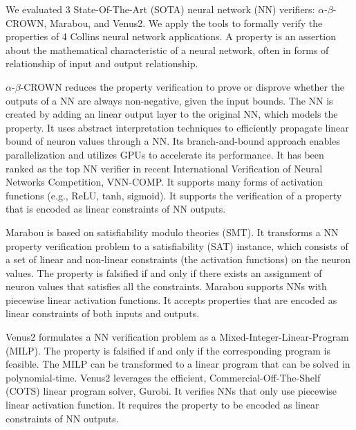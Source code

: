 We evaluated 3 State-Of-The-Art (SOTA) neural network (NN) verifiers: $\alpha$-$\beta$-CROWN, Marabou, and Venus2. We apply the tools to formally verify the properties of 4 Collins neural network applications. A property is an assertion about the mathematical characteristic of a neural network, often in forms of relationship of input and output relationship.

$\alpha$-$\beta$-CROWN reduces the property verification to prove or disprove whether the  outputs of a NN are always non-negative, given the input bounds. The NN is created by adding an linear output layer to the original NN, which models the property. It uses abstract interpretation techniques to efficiently propagate linear bound of neuron values through a NN. Its branch-and-bound approach enables parallelization and utilizes GPUs to accelerate its performance. It has been ranked as the top NN verifier in recent International Verification of Neural Networks Competition, VNN-COMP. It supports many forms of activation functions (e.g., ReLU, tanh, sigmoid).
It supports the verification of a property that is encoded as linear constraints of NN outputs.

Marabou is based on satisfiability modulo theories (SMT). It transforms a NN property verification problem to a satisfiability (SAT) instance, which consists of a set of linear and non-linear constraints (the activation functions) on the neuron values. The property is falsified if and only if  there exists an assignment of neuron values that satisfies all the constraints. Marabou supports NNs with piecewise linear activation functions. It accepts properties that are encoded as linear constraints of both inputs and outputs.

Venus2 formulates a NN verification problem as a Mixed-Integer-Linear-Program (MILP). The property is falsified if and only if the corresponding program is feasible. The MILP can be transformed to a linear program that can be solved in polynomial-time. Venus2 leverages the efficient, Commercial-Off-The-Shelf (COTS) linear program solver, Gurobi. It verifies NNs that only use piecewise linear activation function. It requires the property to be encoded as linear constraints of NN outputs.